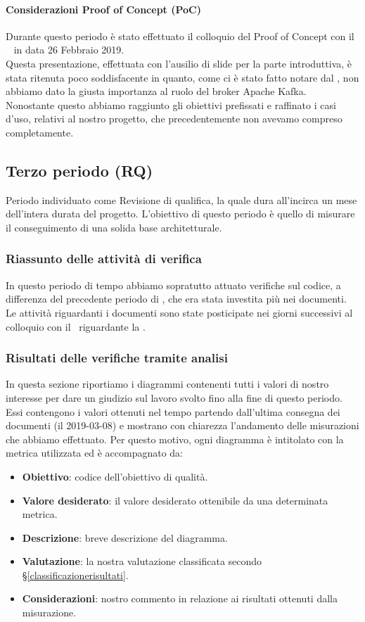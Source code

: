 	\paragraph{Considerazioni Proof of Concept (PoC)}
	Durante questo periodo è stato effettuato il colloquio del Proof of Concept con il \RC~ in data 26 Febbraio 2019.\\
	Questa presentazione, effettuata con l'ausilio di slide per la parte introduttiva, è stata ritenuta poco soddisfacente in quanto, come ci è stato fatto notare dal \RC, non abbiamo dato la giusta importanza al ruolo del broker Apache Kafka.\\
	Nonostante questo abbiamo raggiunto gli obiettivi prefissati e raffinato i casi d'uso, relativi al nostro progetto, che precedentemente non avevamo compreso completamente.

	\subsection{Terzo periodo (RQ)}\label{TerzoPeridodoRQ}
	Periodo individuato come Revisione di qualifica, la quale dura all'incirca un mese dell'intera durata
	del progetto. L'obiettivo di questo periodo è quello di misurare il conseguimento di una solida base
	architetturale.

	\subsubsection{Riassunto delle attività di verifica}
	In questo periodo di tempo abbiamo sopratutto attuato verifiche sul codice, a differenza del precedente
	periodo di \RP, che era stata investita più nei documenti. Le attività riguardanti i documenti sono state posticipate nei giorni successivi al colloquio con il \RC\ riguardante la .

	\subsubsection{Risultati delle verifiche tramite analisi}
	In questa sezione riportiamo i diagrammi contenenti tutti i valori di nostro interesse per dare un giudizio sul lavoro svolto fino alla fine di questo periodo.
	Essi contengono i valori ottenuti nel tempo partendo dall'ultima consegna dei documenti (il 2019-03-08) e mostrano con chiarezza l'andamento delle misurazioni che abbiamo effettuato.
	Per questo motivo, ogni diagramma è intitolato con la metrica utilizzata ed è accompagnato da:
	\begin{itemize}
		\item \textbf{Obiettivo}: codice dell'obiettivo di qualità.
		\item \textbf{Valore desiderato}: il valore desiderato ottenibile da una determinata metrica.
		\item \textbf{Descrizione}: breve descrizione del diagramma.
		\item \textbf{Valutazione}: la nostra valutazione classificata secondo \S\ref{classificazionerisultati}.
		\item \textbf{Considerazioni}: nostro commento in relazione ai risultati ottenuti dalla misurazione.
	\end{itemize}

